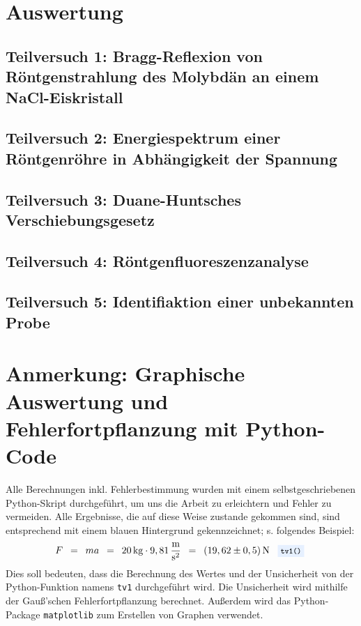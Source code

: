 \documentclass{article}
\newcommand{\widespace}{\enspace}
\newcommand{\wideeq}{\widespace = \widespace}
\newcommand{\result}[2]{
    #1 \, \text{#2}
}
\newcommand{\coderef}[1]{
    \text{
        \enspace
        \footnotesize
        \colorbox{codebg}{\texttt{#1()}}
    }
}
\begin{document}
\section{Auswertung}

    \subsection{Teilversuch 1: Bragg-Reflexion von Röntgenstrahlung des Molybdän an einem NaCl-Eiskristall}

    \newpage

    \subsection{Teilversuch 2: Energiespektrum einer Röntgenröhre in Abhängigkeit der Spannung}
    
    \newpage

    \subsection{Teilversuch 3: Duane-Huntsches Verschiebungsgesetz}

    \newpage

    \subsection{Teilversuch 4: Röntgenfluoreszenzanalyse}

    \newpage

    \subsection{Teilversuch 5: Identifiaktion einer unbekannten Probe}

    \newpage

\newpage

\section{Anmerkung: Graphische Auswertung und Fehlerfortpflanzung mit Python-Code}

Alle Berechnungen inkl. Fehlerbestimmung wurden mit einem selbstgeschriebenen
Python-Skript durchgeführt, um uns die Arbeit zu erleichtern und Fehler zu
vermeiden. Alle Ergebnisse, die auf diese Weise zustande gekommen sind,
sind entsprechend mit einem \colorbox{codebg}{blauen Hintergrund} gekennzeichnet;
s. folgendes Beispiel:
\[
    F \wideeq ma \wideeq \result{20}{kg} \cdot 9,81 \, \frac{\text m}{\text s^2}
    \wideeq \result{(19,62 \pm 0,5)}{N} \coderef{tv1}
\]
Dies soll bedeuten, dass die Berechnung des Wertes und der Unsicherheit von der
Python-Funktion namens \verb|tv1| durchgeführt wird.
Die Unsicherheit wird mithilfe der Gauß'schen Fehlerfortpflanzung berechnet.
Außerdem wird das Python-Package \texttt{matplotlib} zum Erstellen
von Graphen verwendet.
\end{document}
